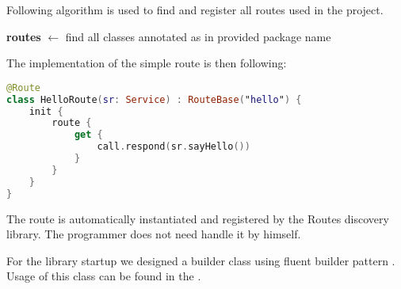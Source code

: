 \medskip \noindent
Following algorithm is used to find and register all routes used in the project.

\begin{algorithm}[H]
	\SetAlgoLined
	\textbf{routes} $\leftarrow$ find all classes annotated as  in provided package name\;
\end{algorithm} 
\medskip \noindent
The implementation of the simple route is then following:

\medskip
\begin{samepage}
\begin{lstlisting}[language=Kotlin]
@Route
class HelloRoute(sr: Service) : RouteBase("hello") {
    init {
        route {
            get {
                call.respond(sr.sayHello())
            }
        }
    }
}
\end{lstlisting}
\end{samepage}

\medskip \noindent
The route is automatically instantiated and registered by the Routes discovery library.
The programmer does not need handle it by himself.

For the library startup we designed a builder class using fluent builder pattern .
Usage of this class can be found in the .